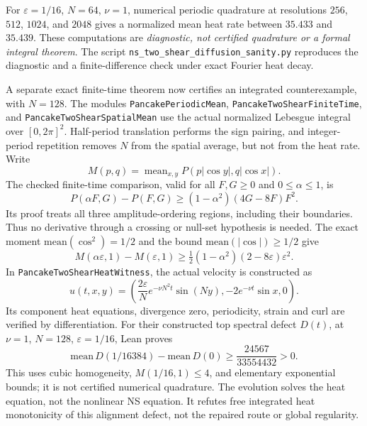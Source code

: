 \documentclass[11pt]{article}
\theoremstyle{definition}
\begin{document}
For $\varepsilon=1/16$, $N=64$, $\nu=1$, numerical periodic quadrature
at resolutions $256$, $512$, $1024$, and $2048$ gives a normalized mean
heat rate between $35.433$ and $35.439$. These computations are
\emph{diagnostic, not certified quadrature or a formal integral theorem}.
The script \texttt{ns\_two\_shear\_diffusion\_sanity.py} reproduces the
diagnostic and a finite-difference check under exact Fourier heat decay.

A separate exact finite-time theorem now certifies an integrated
counterexample, with $N=128$. The modules
\texttt{PancakePeriodicMean}, \texttt{PancakeTwoShearFiniteTime}, and
\texttt{PancakeTwoShearSpatialMean} use the actual normalized Lebesgue
integral over $[0,2\pi]^2$. Half-period translation performs the sign
pairing, and integer-period repetition removes $N$ from the spatial
average, but not from the heat rate. Write
\[
 M(p,q)=\mathop{\mathrm{mean}}_{x,y}
          P(p|\cos y|,q|\cos x|).
\]
The checked finite-time comparison, valid for all $F,G\ge0$ and
$0\le\alpha\le1$, is
\[
 P(\alpha F,G)-P(F,G)
 \ge (1-\alpha^2)(4G-8F)F^2.
\]
Its proof treats all three amplitude-ordering regions, including their
boundaries. Thus no derivative through a crossing or null-set hypothesis
is needed. The exact moment $\mathrm{mean}(\cos^2)=1/2$ and the bound
$\mathrm{mean}(|\cos|)\ge1/2$ give
\[
 M(\alpha\varepsilon,1)-M(\varepsilon,1)
 \ge \tfrac12(1-\alpha^2)(2-8\varepsilon)\varepsilon^2.
\]
In \texttt{PancakeTwoShearHeatWitness}, the actual velocity is constructed as
\[
 u(t,x,y)=\left(\frac{2\varepsilon}{N}e^{-\nu N^2t}\sin(Ny),
                    -2e^{-\nu t}\sin x,0\right).
\]
Its component heat equations, divergence zero, periodicity, strain and
curl are verified by differentiation. For their constructed top spectral
defect $D(t)$, at $\nu=1$, $N=128$, $\varepsilon=1/16$, Lean proves
\[
 \mathrm{mean}\,D(1/16384)-\mathrm{mean}\,D(0)
 \ge \frac{24567}{33554432}>0.
\]
This uses cubic homogeneity, $M(1/16,1)\le4$, and elementary exponential
bounds; it is not certified numerical quadrature. The evolution solves
the heat equation, not the nonlinear NS equation. It refutes free
integrated heat monotonicity of this alignment defect, not the repaired
route or global regularity.
\end{document}
